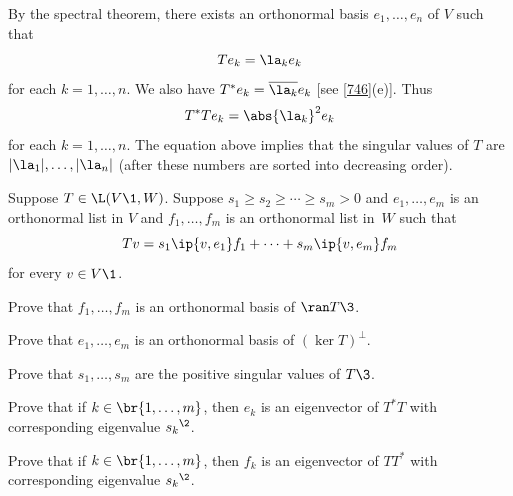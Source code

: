 \begin{Solution}
By the spectral theorem, there exists an orthonormal basis $e_1, \dots, e_n$ of $V$ such that
\[
Te_k = \la_k e_k
\]
for each $k = 1, \ldots, n$. We also have $T^* e_k = \overline{\la_k} e_k$ [see \ref{746}(e)].
Thus
\[
T^*Te_k = \abs{\la_k}^2 e_k
\]
for each $k = 1, \ldots, n$.  The equation above implies that the singular values of $T$ are $|\la_1|, \dots, |\la_n|$ (after these numbers are sorted into decreasing order).
\end{Solution}

\exercise
Suppose $T \in \L(V\1, W)$. Suppose $s_1 \ge  s_2 \ge \cdots \ge s_m >0$ and
$e_1, \dots, e_m$ is an orthonormal list in $V$ and $f_1, \dots, f_m$ is an orthonormal list in~$W$ such that \label{4SVD}
\[
Tv = s_1 \ip{v, e_1} f_1 + \dots + s_m \ip{v, e_m} f_m
\]
for every $v \in V\1$.
\begin{subtheorem}
\item
Prove that $f_1, \dots, f_m$ is an orthonormal basis of $\ran T\3$.
\item
Prove that $e_1, \dots, e_m$  is an orthonormal basis of $(\ker T)^\perp$.
\item
Prove that $s_1, \ldots, s_m$ are the positive singular values of $T\3$.
\item
Prove that if $k \in \br{1, \ldots, m}$, then $e_k$ is an eigenvector of $T^*T$ with corresponding eigenvalue ${s_k}^{\2}$.
\item
Prove that if $k \in \br{1, \ldots, m}$, then $f_k$ is an eigenvector of $TT^*$ with corresponding eigenvalue ${s_k}^{\2}$.
\end{subtheorem}

